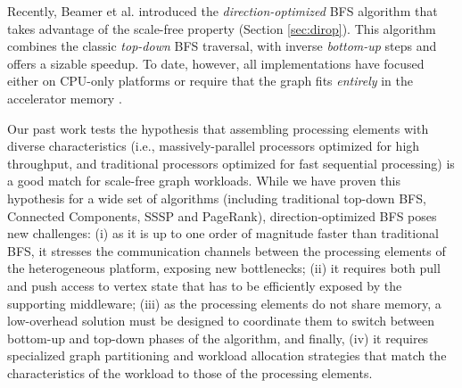 \documentclass{llncs}
\begin{document}
Recently, Beamer et al. \cite{beamer2011searching} introduced the \textit{direction-optimized} BFS algorithm that takes advantage of the scale-free property (Section \ref{sec:dirop}). This algorithm combines the classic \textit{top-down} BFS traversal, with inverse \textit{bottom-up} steps and offers a sizable speedup. To date, however, all implementations have focused either on CPU-only platforms \cite{yasui2014fast} or require that the graph fits \textit{entirely} in the accelerator memory \cite{you2014designing}.

Our past work \cite{gharaibeh2014efficient} tests the hypothesis that assembling processing elements with diverse characteristics (i.e., massively-parallel processors optimized for high throughput, and traditional processors optimized for fast sequential processing) is a good match for scale-free graph workloads. While we have proven this hypothesis for a wide set of algorithms (including traditional top-down BFS, Connected Components, SSSP and PageRank), direction-optimized BFS poses new challenges: (i) as it is up to one order of magnitude faster than traditional BFS, it stresses the communication channels between the processing elements of the heterogeneous platform, exposing new bottlenecks; (ii) it requires both pull and push access to vertex state that has to be efficiently exposed by the supporting middleware; (iii) as the processing elements do not share memory, a low-overhead solution must be designed to coordinate them to switch between bottom-up and top-down phases of the algorithm, and finally, (iv) it requires specialized graph partitioning and workload allocation strategies that match the characteristics of the workload to those of the processing elements.
\end{document}
